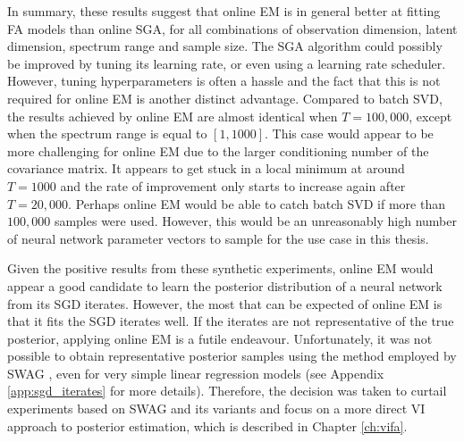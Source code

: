 \documentclass[msc,deptreport.inf]{infthesis} %
\begin{document}
In summary, these results suggest that online EM is in general better at fitting FA models than online SGA, for all combinations of observation dimension, latent dimension, spectrum range and sample size. The SGA algorithm could possibly be improved by tuning its learning rate, or even using a learning rate scheduler. However, tuning hyperparameters is often a hassle and the fact that this is not required for online EM is another distinct advantage. Compared to batch SVD, the results achieved by online EM are almost identical when $T=100,000$, except when the spectrum range is equal to $[1, 1000]$. This case would appear to be more challenging for online EM due to the larger conditioning number of the covariance matrix. It appears to get stuck in a local minimum at around $T=1000$ and the rate of improvement only starts to increase again after $T=20,000$. Perhaps online EM would be able to catch batch SVD if more than $100,000$ samples were used. However, this would be an unreasonably high number of neural network parameter vectors to sample for the use case in this thesis. 

Given the positive results from these synthetic experiments, online EM would appear a good candidate to learn the posterior distribution of a neural network from its SGD iterates. However, the most that can be expected of online EM is that it fits the SGD iterates well. If the iterates are not representative of the true posterior, applying online EM is a futile endeavour. Unfortunately, it was not possible to obtain representative posterior samples using the method employed by SWAG \cite{maddox2019}, even for very simple linear regression models (see Appendix \ref{app:sgd_iterates} for more details). Therefore, the decision was taken to curtail experiments based on SWAG and its variants and focus on a more direct VI approach to posterior estimation, which is described in Chapter \ref{ch:vifa}.
\end{document}
